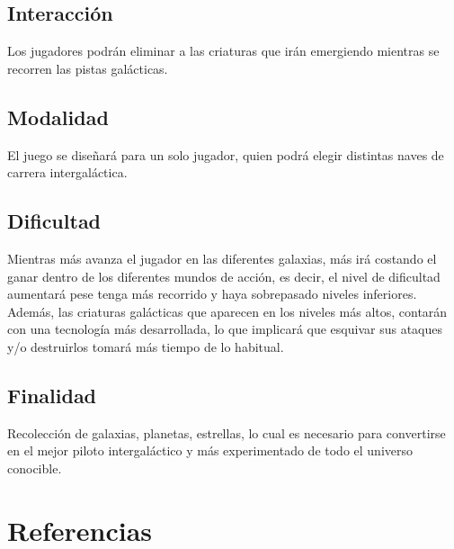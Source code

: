 \documentclass{article}
\begin{document}
\subsection{Interacción}
Los jugadores podrán eliminar a las criaturas que irán emergiendo mientras se recorren las pistas galácticas.

\subsection{Modalidad}
El juego se diseñará para un solo jugador, quien podrá elegir distintas naves de carrera intergaláctica.

\subsection{Dificultad}
Mientras más avanza el jugador en las diferentes galaxias, más irá costando el ganar dentro de los diferentes mundos de acción, es decir, el nivel de dificultad aumentará pese tenga más recorrido y haya sobrepasado niveles inferiores. Además, las criaturas galácticas que aparecen en los niveles más altos, contarán con una tecnología más desarrollada, lo que implicará que esquivar sus ataques y/o destruirlos tomará más tiempo de lo habitual. 

\subsection{Finalidad}
Recolección de galaxias, planetas, estrellas, lo cual es necesario para convertirse en el mejor piloto intergaláctico y más experimentado de todo el universo conocible. 
\newpage
\section{Referencias}


\cite{calistenia}
\end{document}
